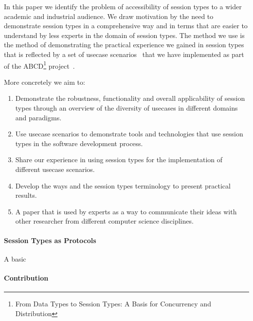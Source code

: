 In this paper we identify the problem of accessibility of session
types to a wider academic and industrial audience.
We draw motivation by the need to demonstrate session
types in a comprehensive way and in terms that are easier to
understand by less experts in the domain of session types.
The method we use is the method of demonstrating the practical
experience we gained in session types that is reflected by a set of
usecase scenarios~\cite{usecase_repository} that we have implemented as part of 
the ABCD\footnote{From Data Types to Session Types:
A Basis for Concurrency and Distribution} project~\cite{ABCD}.

More concretely we aim to:
%
\begin{enumerate}%
	\item	Demonstrate the robustness, functionality and overall applicability of session types
			through an overview of the diversity of usecases in different domains
			and paradigms.

	\item	Use usecase scenarios to demonstrate tools and technologies that
			use session types in the software development process.

	\item	Share our experience in using session types for the
			implementation of different usecase scenarios.

	\item	Develop the ways and the session types terminology to
			present practical results.

	\item	A paper that is used by experts as a way to communicate
			their ideas with other researcher from different computer
			science disciplines.
\end{enumerate}

\paragraph{Session Types as Protocols}
A basic 

\paragraph{Contribution}



